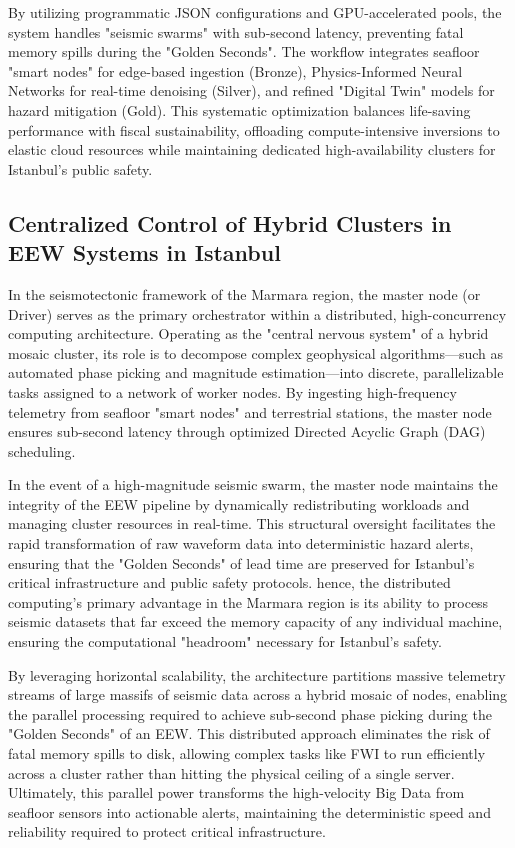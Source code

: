 \documentclass[data,article,submit,pdftex,moreauthors]{Definitions/mdpi}
\begin{document}
By utilizing programmatic JSON configurations and GPU-accelerated pools, the system handles "seismic swarms" with sub-second latency, preventing fatal memory spills during the "Golden Seconds". The workflow integrates seafloor "smart nodes" for edge-based ingestion (Bronze), Physics-Informed Neural Networks for real-time denoising (Silver), and refined "Digital Twin" models for hazard mitigation (Gold). This systematic optimization balances life-saving performance with fiscal sustainability, offloading compute-intensive inversions to elastic cloud resources while maintaining dedicated high-availability clusters for Istanbul’s public safety.

\subsection{Centralized Control of Hybrid Clusters in EEW Systems in Istanbul}

In the seismotectonic framework of the Marmara region, the master node (or Driver) serves as the primary orchestrator within a distributed, high-concurrency computing architecture. Operating as the "central nervous system" of a hybrid mosaic cluster, its role is to decompose complex geophysical algorithms—such as automated phase picking and magnitude estimation—into discrete, parallelizable tasks assigned to a network of worker nodes. By ingesting high-frequency telemetry from seafloor "smart nodes" and terrestrial stations, the master node ensures sub-second latency through optimized Directed Acyclic Graph (DAG) scheduling. 

In the event of a high-magnitude seismic swarm, the master node maintains the integrity of the EEW pipeline by dynamically redistributing workloads and managing cluster resources in real-time. This structural oversight facilitates the rapid transformation of raw waveform data into deterministic hazard alerts, ensuring that the "Golden Seconds" of lead time are preserved for Istanbul’s critical infrastructure and public safety protocols. hence, the distributed computing's primary advantage in the Marmara region is its ability to process seismic datasets that far exceed the memory capacity of any individual machine, ensuring the computational "headroom" necessary for Istanbul’s safety. 

By leveraging horizontal scalability, the architecture partitions massive telemetry streams of large massifs of seismic data across a hybrid mosaic of nodes, enabling the parallel processing required to achieve sub-second phase picking during the "Golden Seconds" of an EEW. This distributed approach eliminates the risk of fatal memory spills to disk, allowing complex tasks like FWI to run efficiently across a cluster rather than hitting the physical ceiling of a single server. Ultimately, this parallel power transforms the high-velocity Big Data from seafloor sensors into actionable alerts, maintaining the deterministic speed and reliability required to protect critical infrastructure.
\end{document}
